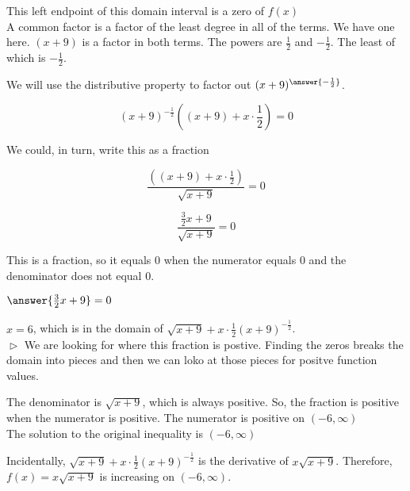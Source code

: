 \documentclass{ximera}
\begin{document}
\begin{example}
\begin{explanation}
This left endpoint of this domain interval is a zero of $f(x)$ \\ 






A common factor is a factor of the least degree in all of the terms.  We have one here. $(x+9)$ is a factor in both terms.  The powers are $\frac{1}{2}$ and $-\frac{1}{2}$. The least of which is $-\frac{1}{2}$.

We will use the distributive property to factor out $(x+9)^{\answer{-\frac{1}{2}}}$.


\[ (x+9)^{-\tfrac{1}{2}} \left((x+9) + x \cdot \frac{1}{2}\right)  = 0 \]


We could, in turn, write this as a fraction


\[ \frac{\left((x+9) + x \cdot \frac{1}{2}\right)}{\sqrt{x+9}} = 0 \]


\[ \frac{ \frac{3}{2} x + 9}{\sqrt{x+9}} = 0 \]



This is a fraction, so it equals $0$ when the numerator equals $0$ and the denominator does not equal $0$.


$\answer{\frac{3}{2} x + 9} = 0$



$x = 6$, which is in the domain of $\sqrt{x+9} + x \cdot \frac{1}{2} (x+9)^{-\tfrac{1}{2}}$. \\

$\vartriangleright$ We are looking for where this fraction is postive. Finding the zeros breaks the domain into pieces and then we can loko at those pieces for positve function values.

The denominator is $\sqrt{x+9}$, which is always positive.  So, the fraction is positive when the numerator is positive.  The numerator is positive on $(-6, \infty)$ \\





The solution to the original inequality is $(-6, \infty)$


\end{explanation}

\end{example}



Incidentally, $\sqrt{x+9} + x \cdot \frac{1}{2} (x+9)^{-\tfrac{1}{2}}$ is the derivative of $x \sqrt{x+9}$. Therefore, $f(x) = x \sqrt{x+9}$ is increasing on $(-6, \infty)$. \\
\end{document}
